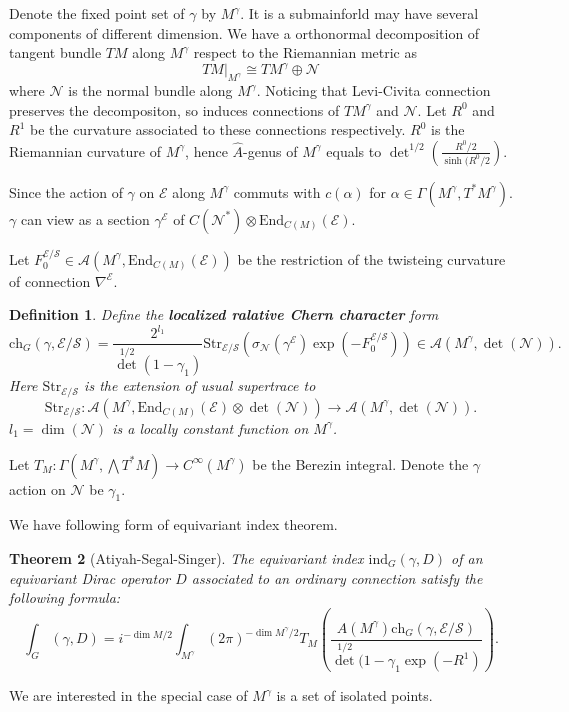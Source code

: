 \documentclass[11pt]{amsart}
\newtheorem{Thm}{Theorem}
\newtheorem{Def}[Thm]{Definition}
\def\cA{{\mathcal{A}}}
\def\cN{{\mathcal{N}}}
\def\cE{{\mathcal{E}}}
\def\cS{{\mathcal{S}}}
\def\End{{\mathrm{End}}}
\def\Str{{\mathrm{Str}}}
\def\kw#1{{\bf \em #1}}
\def\ch{\mathrm{ch}}
\def\Ah{{\hat{A}}}
\def\ind{\mathrm{ind}}
\def\Mr{M^{\gamma}}
\begin{document}
Denote the fixed point set of $\gamma$ by $M^\gamma$. It is a submainforld 
may have several components of different dimension. We have a orthonormal
decomposition
of tangent bundle $TM$ along $M^\gamma$ respect to the Riemannian metric as
\[
TM|_{M^\gamma} \cong T\Mr \oplus \cN
\]
where $\cN$ is the normal bundle along $\Mr$. 
Noticing that Levi-Civita connection preserves the decompositon, so 
induces connections of $T\Mr$ and $\cN$. Let $R^0$ and $R^1$ be the curvature
associated to these connections respectively. $R^0$ is the Riemannian curvature
of $M^\gamma$, 
hence $\Ah$-genus of $M^\gamma$ 
equals to $\det^{1/2}\left(\frac{R^0/2}{\sinh(R^0/2}\right)$.

Since the action of $\gamma$ on $\cE$ along $M^\gamma$ commuts with 
$c(\alpha)$ for $\alpha\in \Gamma(\Mr,T^*\Mr)$. $\gamma$ can view as a 
section $\gamma^\cE$ of $C(\cN^*)\otimes \End_{C(M)}(\cE)$.

Let $F_0^{\cE/\cS}\in \cA(M^\gamma,\End_{C(M)}(\cE))$ be the restriction of the twisteing curvature of
connection $\nabla^\cE$. 
\begin{Def}
Define the \kw{localized ralative Chern character} form
\[
\ch_G(\gamma, \cE/\cS) = \frac{2^{l_1}}{\det^{1/2}(1-\gamma_1)}
\Str_{\cE/\cS}(\sigma_{\cN}(\gamma^\cE)\exp(-F_0^{\cE/\cS})) \in \cA(M^\gamma,\det(\cN)).
\]
Here $\Str_{\cE/\cS}$ is the extension of usual supertrace to 
\[
\Str_{\cE/\cS}\colon \cA(\Mr, \End_{C(M)}(\cE)\otimes \det(\cN))
\to \cA(\Mr,\det(\cN)).
\]
$l_1 = \dim(\cN)$ is a locally constant function on $\Mr$. 
\end{Def}

Let $T_M\colon \Gamma(\Mr, \bigwedge T^*M) \to C^{\infty}(\Mr)$ be the 
Berezin integral. Denote the $\gamma$ action on $\cN$ be $\gamma_1$.

We have following form of equivariant index theorem.
\begin{Thm}[Atiyah-Segal-Singer]
The equivariant index $\ind_G(\gamma,D)$ of an equivariant Dirac operator $D$
associated to an ordinary connection satisfy the following formula:
\begin{equation}\label{eq:fixed}
\int_G(\gamma, D) = i^{-\dim M/2}\int_{\Mr}(2\pi)^{-\dim \Mr/2} T_M
\left(\frac{\Ah(\Mr)\ch_G(\gamma,\cE/\cS)}{\det^{1/2}
(1-\gamma_1\exp(-R^1)}\right).
\end{equation}
\end{Thm}

We are interested in the special case of $\Mr$ is a set of isolated points.
\end{document}
